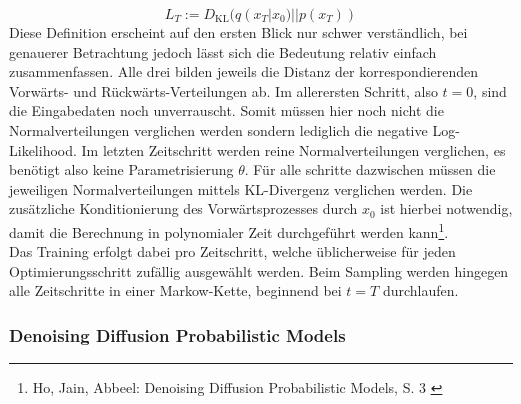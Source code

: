 \begin{equation}
    L_T := D_\text{KL}(q(x_T|x_0)||p(x_T))
\end{equation}
Diese Definition erscheint auf den ersten Blick nur schwer verständlich, bei genauerer Betrachtung jedoch lässt sich die Bedeutung relativ einfach zusammenfassen. Alle drei bilden jeweils die Distanz der korrespondierenden Vorwärts- und Rückwärts-Verteilungen ab. Im allerersten Schritt, also $t=0$, sind die Eingabedaten noch unverrauscht. Somit müssen hier noch nicht die Normalverteilungen verglichen werden sondern lediglich die negative Log-Likelihood. Im letzten Zeitschritt werden reine Normalverteilungen verglichen, es benötigt also keine Parametrisierung $\theta$. Für alle schritte dazwischen müssen die jeweiligen Normalverteilungen mittels KL-Divergenz verglichen werden. Die zusätzliche Konditionierung des Vorwärtsprozesses durch $x_0$ ist hierbei notwendig, damit die Berechnung in polynomialer Zeit durchgeführt werden kann\footnote{
    Ho, Jain, Abbeel: Denoising Diffusion Probabilistic Models, S. 3
    \cite{ho2020denoisingdiffusionprobabilisticmodels}
}. \\
Das Training erfolgt dabei pro Zeitschritt, welche üblicherweise für jeden Optimierungsschritt zufällig ausgewählt werden. Beim Sampling werden hingegen alle Zeitschritte in einer Markow-Kette, beginnend bei $t=T$ durchlaufen. 


\subsubsection{Denoising Diffusion Probabilistic Models}

